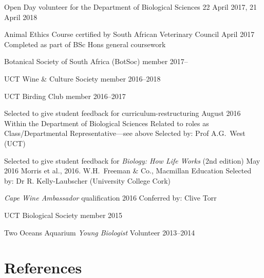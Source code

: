 \documentclass[10pt]{article}
\begin{document}
\begin{hangparas}{2em}{1}

Open Day volunteer for the Department of Biological Sciences
                                    \hfill 22 April 2017, 21 April 2018

Animal Ethics Course certified by South African Veterinary Council
                                                        \hfill April 2017 \break
Completed as part of BSc Hons general coursework

Botanical Society of South Africa (BotSoc) member         \hfill 2017--

UCT Wine \& Culture Society member                    \hfill 2016--2018

UCT Birding Club member                               \hfill 2016--2017

Selected to give student feedback for curriculum-restructuring
                                              \hfill August 2016 \break
Within the Department of Biological Sciences \break
Related to roles as Class/Departmental Representative---see above \break
Selected by: Prof A.G.~West (UCT)

Selected to give student feedback for \textit{Biology: How Life Works} (2nd 
edition)                                         \hfill May 2016 \break
Morris et al., 2016. W.H.~Freeman \& Co., Macmillan Education \break
Selected by: Dr R. Kelly-Laubscher (University College Cork)

\textit{Cape Wine Ambassador} qualification          \hfill 2016 \break
Conferred by: Clive Torr

UCT Biological Society member                               \hfill 2015

Two Oceans Aquarium \textit{Young Biologist} Volunteer \hfill 2013--2014

\hfill

\end{hangparas}

\hrulefill

\section*{References} %
\end{document}
